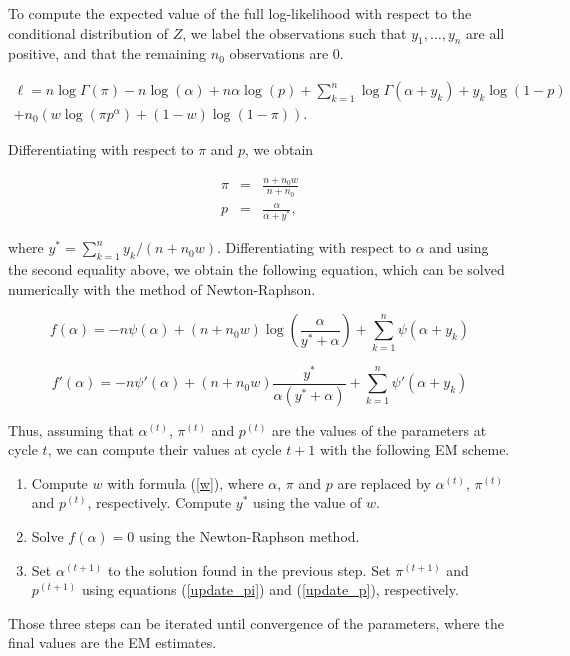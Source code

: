 \documentclass[12pt]{article}
\begin{document}
\begin{appendices}
    To compute the expected value of the full log-likelihood with
    respect to the conditional distribution of $Z$, we label the
    observations such that $y_1, \ldots, y_n$ are all positive, and
    that the remaining $n_0$ observations are 0.

    \begin{eqnarray*}
      \ell = n \log \Gamma(\pi) - n\log (\alpha) +
      n \alpha \log(p) +
      \sum_{k=1}^n \log \Gamma(\alpha + y_k) + y_k \log (1-p) \\
      + n_0 \left( w \log(\pi p^{\alpha}) +
    (1-w) \log(1-\pi) \right).
    \end{eqnarray*}

    Differentiating with respect to $\pi$ and $p$, we obtain

    \begin{eqnarray}
\label{update_pi}
      \pi &=& \frac{n+n_0w}{n+n_0} \\
\label{update_p}
      p &=& \frac{\alpha}{\alpha + y^*}, 
    \end{eqnarray}

    \noindent
    where $y^* = \sum_{k=1}^ny_k/(n+n_0w)$.
    Differentiating with respect to $\alpha$ and using the second
    equality above, we obtain the following equation, which can be
    solved numerically with the method of Newton-Raphson.

    \begin{equation*}
      f(\alpha) = -n \psi(\alpha) + (n+n_0w) \log \left(\frac{\alpha}{y^*
      + \alpha} \right) + \sum_{k=1}^n \psi(\alpha + y_k)
    \end{equation*}

    \begin{equation*}
      f'(\alpha) = -n \psi'(\alpha) + (n+n_0w)
      \frac{y^*}{\alpha(y^*+\alpha)} + \sum_{k=1}^n \psi'(\alpha + y_k)
    \end{equation*}

  Thus, assuming that $\alpha^{(t)}$, $\pi^{(t)}$ and $p^{(t)}$ are the
  values of the parameters at cycle $t$, we can compute their values
  at cycle $t+1$ with the following EM scheme.

  \begin{enumerate}
  \item Compute $w$ with formula (\ref{w}), where $\alpha$, $\pi$
    and $p$ are replaced by $\alpha^{(t)}$, $\pi^{(t)}$ and $p^{(t)}$,
    respectively. Compute $y^*$ using the value of $w$.
  \item Solve $f(\alpha) = 0$ using the Newton-Raphson method.
  \item Set $\alpha^{(t+1)}$ to the solution found in the previous
    step. Set $\pi^{(t+1)}$ and $p^{(t+1)}$ using equations
    (\ref{update_pi}) and (\ref{update_p}), respectively.
  \end{enumerate}

Those three steps can be iterated until convergence of the parameters,
where the final values are the EM estimates.

\end{appendices}
\end{document}
